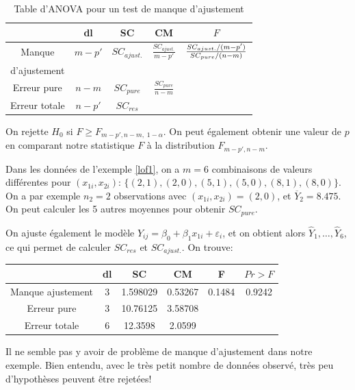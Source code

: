 \begin{table}[h!]
\centering
\begin{tabular}{|c||c|c|c|c|}\hline\
 & dl & SC & CM & $F$  \\ \hline\hline
 Manque &  $m-p'$ & $SC_{ajust.}$ &    $\frac{SC_{ajust.}}{m-p'}$  &     ${SC_{ajust.}/(m-p')\over SC_{pure}/(n-m)}$   \\
 d'ajustement & & & &  \\
 Erreur pure  & $n-m$ & $SC_{pure}$ &   $\frac{SC_{pure}}{n-m}$  & \\
 Erreur totale & $n-p'$ & $SC_{res}$ &    &  \\ \hline
\end{tabular}
\caption{Table d'ANOVA pour un test de manque d'ajustement}
\label{tab:anovaLOF}
\end{table}

On rejette $H_0$ si  $F \ge F_{m-p',n-m,\;1-\alpha}$. On peut également obtenir une valeur de $p$ en comparant notre statistique $F$ à la distribution $F_{m-p',n-m}$.

\vspace{0.05in}
\begin{exemple}
Dans les données de l'exemple \ref{lof1}, on a $m=6$ combinaisons de valeurs différentes pour $(x_{1i},x_{2i})$: $\{ (2,1),(2,0),  (5,1), (5,0), (8,1),(8,0)\}$. \\
On a par exemple $n_2=2$ observations avec $(x_{1i},x_{2i})=(2,0)$, et $\overline{Y}_2=8.475$.\\
On peut calculer les 5 autres moyennes pour obtenir $SC_{pure}$.

On ajuste également le modèle $Y_{ij}=\beta_0+\beta_1x_{1i}+\varepsilon_i$, et on obtient alors $\hat{Y}_1, \ldots, \hat{Y}_6$, ce qui permet de calculer $SC_{res}$ et $SC_{ajust.}$. On trouve:

\begin{center}
\begin{tabular}{||c||c|c|c|c|c||}\hline\hline
  & dl & SC & CM & F & $Pr>F$ \\ \hline\hline
 Manque ajustement &  3 &    1.598029 &    0.53267  &     0.1484   &
 0.9242 \\
 Erreur pure  &  3 &   10.76125 &    3.58708  & & \\
 Erreur totale &  6 &   12.3598 &   2.0599   & & \\ \hline\hline
\end{tabular}
\vspace{5mm}
\end{center}

\vspace{-0.05in}
Il ne semble pas y avoir de problème de manque d'ajustement dans notre exemple. Bien entendu, avec le très petit nombre de données observé, très peu d'hypothèses peuvent \^etre rejetées!
\end{exemple}

